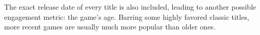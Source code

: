 The exact release date of every title is also included, leading to another possible engagement metric: the game's age. Barring some highly favored classic titles, more recent games are usually much more popular than older ones.








